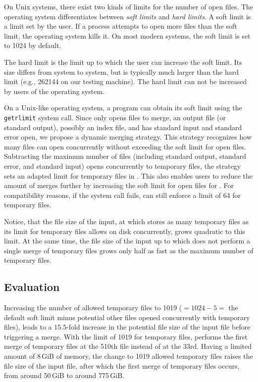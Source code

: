 \label{limits} On Unix systems, there exist two kinds of limits for the number of open files. The operating system differentiates between \textit{soft limits} and \textit{hard limits}.
A soft limit is a limit set by the user. If a process attempts to open more files than the soft limit, the operating system kills it. On most modern systems, the soft limit is set to 1024 by default. 

The hard limit is the limit up to which the user can increase the soft limit. Its size differs from system to system, but is typically much larger than the hard limit (e.g., 262144 on our testing machine). The hard limit can not be increased by users of the operating system. 

On a Unix-like operating system, a program can obtain its soft limit using the \texttt{getrlimit} \cite{noauthor_getrlimit2_nodate} system call. Since \sort only opens files to merge, an output file (or standard output), possibly an index file, and has standard input and standard error open, we propose a dynamic merging strategy. This strategy recognizes how many files \sort can open concurrently without exceeding the soft limit for open files. Subtracting the maximum number of files (including standard output, standard error, and standard input) \sort opens concurrently to temporary files, the strategy sets an adapted limit for temporary files in \sort. This also enables users to reduce the amount of merges further by increasing the soft limit for open files for \sort. For compatibility reasons, if the system call fails, \sort can still enforce a limit of 64 for temporary files.
 

Notice, that the file size of the input, at which \sort stores as many temporary files as its limit for temporary files allows on disk concurrently, grows quadratic to this limit. At the same time, the file size of the input up to which \sort does not perform a single merge of temporary files grows only half as fast as the maximum number of temporary files.

\subsection{Evaluation}
Increasing the number of allowed temporary files to 1019 ($=1024-5 =$  the default soft limit minus potential other files opened concurrently with temporary files), leads to a 15.5-fold increase in the potential file size of the input file before triggering a merge. With the limit of 1019 for temporary files, \sort performs the first merge of temporary files at the 510th file instead of at the 33rd. Having a limited amount of 8\,GiB of memory, the change to 1019 allowed temporary files raises the file size of the input file, after which the first merge of temporary files occurs, from around 50\,GiB to around 775\,GiB.

